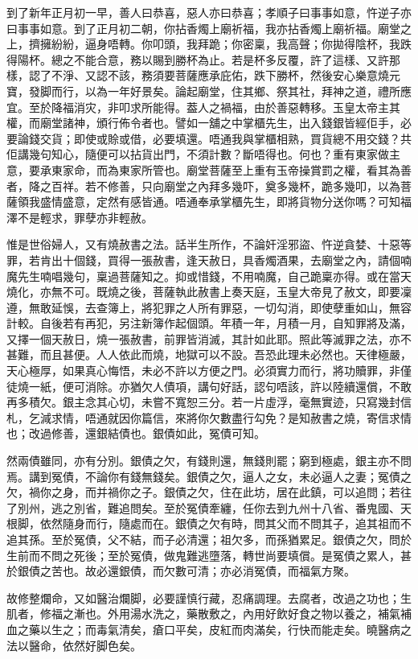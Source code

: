 \documentclass[a5paper, 12pt, openany]{book} %
\begin{document}
	到了新年正月初一早，善人曰恭喜，惡人亦曰恭喜；孝順子曰事事如意，忤逆子亦曰事事如意。到了正月初二朝，你拈香燭上廟祈福，我亦拈香燭上廟祈福。廟堂之上，擠擁紛紛，逼身唔轉。你叩頭，我拜跪；你密稟，我高聲；你拋得陰杯，我跌得陽杯。總之不能合意，務以賜到勝杯為止。若是杯多反覆，許了這樣、又許那樣，認了不淨、又認不該，務須要菩薩應承庇佑，跌下勝杯，然後安心樂意燒元寶，發脚而行，以為一年好景矣。論起廟堂，住其鄉、祭其社，拜神之道，禮所應宜。至於降福消灾，非叩求所能得。葢人之禍福，由於善惡轉移。玉皇太帝主其權，而廟堂諸神，頒行佈令者也。譬如一舖之中掌櫃先生，出入錢銀皆經佢手，必要論錢交貨；即使或賒或借，必要填還。唔通我與掌櫃相熟，買貨總不用交錢？共佢講幾句知心，隨便可以拈貨出門，不須計數？斷唔得也。何也？重有東家做主意，要承東家命，而為東家所管也。廟堂菩薩至上重有玉帝操賞罰之權，看其為善者，降之百祥。若不修善，只向廟堂之內拜多幾吓，奠多幾杯，跪多幾叩，以為菩薩領我盛情盛意，定然有感皆通。唔通奉承掌櫃先生，即將貨物分送你嗎？可知福澤不是輕求，罪孽亦非輕赦。

	惟是世俗婦人，又有燒赦書之法。話半生所作，不論奸淫邪盜、忤逆貪婪、十惡等罪，若肯出十個錢，買得一張赦書，逢天赦日，具香燭酒果，去廟堂之內，請個喃魔先生喃唱幾句，稟過菩薩知之。抑或惜錢，不用喃魔，自己跪稟亦得。或在當天燒化，亦無不可。既燒之後，菩薩執此赦書上奏天庭，玉皇大帝見了赦文，即要凜遵，無敢延悞，去查簿上，將犯罪之人所有罪惡，一切勾消，即使孽重如山，無容計較。自後若有再犯，另注新簿作起個頭。年積一年，月積一月，自知罪將及滿，又擇一個天赦日，燒一張赦書，前罪皆消滅，其計如此耶。照此等滅罪之法，亦不甚難，而且甚便。人人依此而燒，地獄可以不設。吾恐此理未必然也。天律極嚴，天心極厚，如果真心悔悟，未必不許以方便之門。必須實力而行，將功贖罪，非僅徒燒一紙，便可消除。亦猶欠人債項，講句好話，認句唔該，許以陸續還償，不敢再多積欠。銀主念其心切，未嘗不寬恕三分。若一片虛浮，毫無實迹，只寫幾封信札，乞減求情，唔通就因你篇信，來將你欠數盡行勾免？是知赦書之燒，寄信求情也；改過修善，還銀結債也。銀債如此，冤債可知。

	然兩債雖同，亦有分別。銀債之欠，有錢則還，無錢則罷；窮到極處，銀主亦不問焉。講到冤債，不論你有錢無錢矣。銀債之欠，逼人之女，未必逼人之妻；冤債之欠，禍你之身，而并禍你之子。銀債之欠，住在此坊，居在此鎮，可以追問；若往了別州，逃之別省，難追問矣。至於冤債牽纏，任你去到九州十八省、番鬼國、天根脚，依然隨身而行，隨處而在。銀債之欠有時，問其父而不問其子，追其祖而不追其孫。至於冤債，父不結，而子必清還；祖欠多，而孫猶累足。銀債之欠，問於生前而不問之死後；至於冤債，做鬼難逃墮落，轉世尚要填償。是冤債之累人，甚於銀債之苦也。故必還銀債，而欠數可清；亦必消冤債，而福氣方聚。

	故修整爛命，又如醫治爛脚，必要謹慎行藏，忍痛調理。去腐者，改過之功也；生肌者，修福之漸也。外用湯水洗之，藥散敷之，內用好飲好食之物以養之，補氣補血之藥以生之；而毒氣清矣，瘡口平矣，皮紅而肉滿矣，行快而能走矣。曉醫病之法以醫命，依然好脚色矣。
\end{document}
